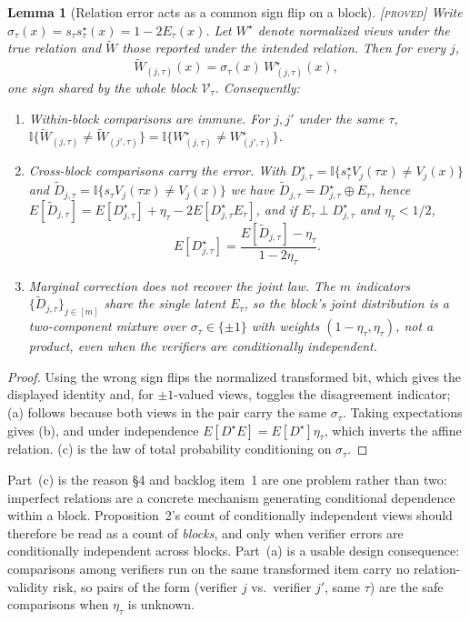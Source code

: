 \documentclass[11pt]{article}
\newtheorem{lemma}{Lemma}
\theoremstyle{remark}
\newcommand{\status}[1]{\hfill{\normalfont\small\textsc{[#1]}}}
\newcommand{\cV}{\mathcal{V}}
\begin{document}
\begin{lemma}[Relation error acts as a common sign flip on a block]\status{proved}
Write $\sigma_\tau(x)=s_\tau s^\star_\tau(x)=1-2E_\tau(x)$. Let $W^\star$ denote normalized views under the true relation and $\widetilde W$ those reported under the intended relation. Then for every $j$,
\[
\widetilde W_{(j,\tau)}(x)=\sigma_\tau(x)\,W^\star_{(j,\tau)}(x),
\]
one sign shared by the whole block $\cV_\tau$. Consequently:
\begin{enumerate}
\item[(a)] \emph{Within-block comparisons are immune.} For $j,j'$ under the same $\tau$, $\mathbb{I}\{\widetilde W_{(j,\tau)}\neq\widetilde W_{(j',\tau)}\}=\mathbb{I}\{W^\star_{(j,\tau)}\neq W^\star_{(j',\tau)}\}$.
\item[(b)] \emph{Cross-block comparisons carry the error.} With $D^\star_{j,\tau}=\mathbb{I}\{s^\star_\tau V_j(\tau x)\neq V_j(x)\}$ and $\widetilde D_{j,\tau}=\mathbb{I}\{s_\tau V_j(\tau x)\neq V_j(x)\}$ we have $\widetilde D_{j,\tau}=D^\star_{j,\tau}\oplus E_\tau$, hence
$E[\widetilde D_{j,\tau}]=E[D^\star_{j,\tau}]+\eta_\tau-2E[D^\star_{j,\tau}E_\tau]$, and if $E_\tau\perp D^\star_{j,\tau}$ and $\eta_\tau<1/2$,
\[
E[D^\star_{j,\tau}]=\frac{E[\widetilde D_{j,\tau}]-\eta_\tau}{1-2\eta_\tau}.
\]
\item[(c)] \emph{Marginal correction does not recover the joint law.} The $m$ indicators $\{\widetilde D_{j,\tau}\}_{j\in[m]}$ share the single latent $E_\tau$, so the block's joint distribution is a two-component mixture over $\sigma_\tau\in\{\pm1\}$ with weights $(1-\eta_\tau,\eta_\tau)$, not a product, even when the verifiers are conditionally independent.
\end{enumerate}
\end{lemma}
\begin{proof}
Using the wrong sign flips the normalized transformed bit, which gives the displayed identity and, for $\pm1$-valued views, toggles the disagreement indicator; (a) follows because both views in the pair carry the same $\sigma_\tau$. Taking expectations gives (b), and under independence $E[D^\star E]=E[D^\star]\eta_\tau$, which inverts the affine relation. (c) is the law of total probability conditioning on $\sigma_\tau$.
\end{proof}

Part~(c) is the reason \S4 and backlog item~1 are one problem rather than two: imperfect relations are a concrete mechanism generating conditional dependence within a block. Proposition~2's count of conditionally independent views should therefore be read as a count of \emph{blocks}, and only when verifier errors are conditionally independent across blocks. Part~(a) is a usable design consequence: comparisons among verifiers run on the same transformed item carry no relation-validity risk, so pairs of the form (verifier $j$ vs.\ verifier $j'$, same $\tau$) are the safe comparisons when $\eta_\tau$ is unknown.
\end{document}
